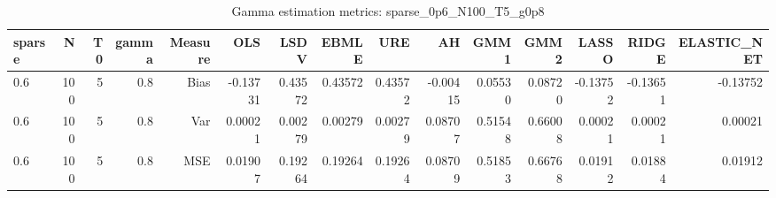 \begin{table}[!htbp]\centering
\caption{Gamma estimation metrics: sparse_0p6_N100_T5_g0p8}
\label{tab:table1_sparse_0p6_N100_T5_g0p8}
\begin{tabular}{lrrrrrrrrrrrrrr}
\hline
sparse & N & T0 & gamma & Measure & OLS & LSDV & EBMLE & URE & AH & GMM1 & GMM2 & LASSO & RIDGE & ELASTIC_NET \\
\hline
0.6 & 100 & 5 & 0.8 & Bias & -0.13731 & 0.43572 & 0.43572 & 0.43572 & -0.00415 & 0.05530 & 0.08720 & -0.13752 & -0.13651 & -0.13752 \\
0.6 & 100 & 5 & 0.8 & Var & 0.00021 & 0.00279 & 0.00279 & 0.00279 & 0.08707 & 0.51548 & 0.66008 & 0.00021 & 0.00021 & 0.00021 \\
0.6 & 100 & 5 & 0.8 & MSE & 0.01907 & 0.19264 & 0.19264 & 0.19264 & 0.08709 & 0.51853 & 0.66768 & 0.01912 & 0.01884 & 0.01912 \\
\hline
\end{tabular}
\end{table}

